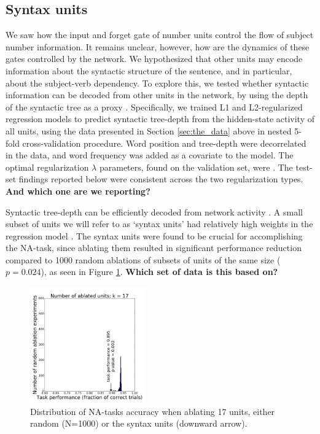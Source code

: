 \subsection{Syntax units}
\label{sec:syntax-units}
We saw how the input and forget gate of number units control the flow
of subject number information. It remains unclear, however, how are
the dynamics of these gates controlled by the network. We hypothesized
that other units may encode information about the syntactic structure
of the sentence, and in particular, about the subject-verb
dependency. To explore this, we tested whether syntactic information
can be decoded from other units in the network, by using the depth of
the syntactic tree as a proxy \cite{Nelson:etal:2017}. Specifically,
we trained L1 and L2-regularized regression models to predict
syntactic tree-depth from the hidden-state activity of all units,
using the data presented in Section \ref{sec:the_data} above in nested
5-fold cross-validation procedure.  Word position and tree-depth were
decorrelated in the data, and word frequency was added as a covariate
to the model. The optimal regularization $\lambda$ parameters, found
on the validation set, were . The test-set
findings reported below were consistent across the two regularization
types. \textbf{And which one are we reporting?}

Syntactic tree-depth can be efficiently decoded from network activity
. A small subset of units we will refer to
as `syntax units' had relatively high weights in the regression model
. The syntax
units were found to be crucial for accomplishing the NA-task, since
ablating them resulted in significant performance reduction compared
to 1000 random ablations of subsets of units of the same size
($p=0.024$), as seen in Figure \ref{fig:ablation-syntax}. \textbf{Which set of data is this based on?}

\begin{figure}[h]
    \centering
    \includegraphics[height=5cm]{Figures/null_distribution_ablation_experiment_k_17.png}
    \caption{Distribution of NA-tasks accuracy when ablating 17 units,
      either random (N=1000) or the syntax units (downward arrow).}
    \label{fig:ablation-syntax}
\end{figure}

